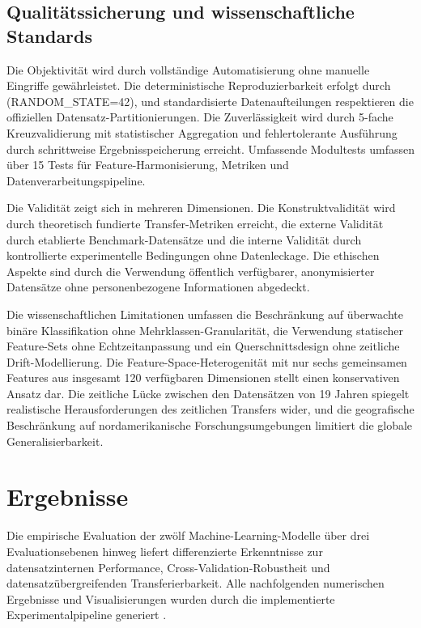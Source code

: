 \documentclass[11pt,a4paper]{article}
\begin{document}
    \subsection{Qualitätssicherung und wissenschaftliche Standards}

    Die Objektivität wird durch vollständige Automatisierung ohne manuelle Eingriffe gewährleistet. Die deterministische Reproduzierbarkeit erfolgt durch (RANDOM\_STATE=42), und standardisierte Datenaufteilungen respektieren die offiziellen Datensatz-Partitionierungen. Die Zuverlässigkeit wird durch 5-fache Kreuzvalidierung mit statistischer Aggregation und fehlertolerante Ausführung durch schrittweise Ergebnisspeicherung erreicht. Umfassende Modultests umfassen über 15 Tests für Feature-Harmonisierung, Metriken und Datenverarbeitungspipeline.

    Die Validität zeigt sich in mehreren Dimensionen. Die Konstruktvalidität wird durch theoretisch fundierte Transfer-Metriken erreicht, die externe Validität durch etablierte Benchmark-Datensätze und die interne Validität durch kontrollierte experimentelle Bedingungen ohne Datenleckage. Die ethischen Aspekte sind durch die Verwendung öffentlich verfügbarer, anonymisierter Datensätze ohne personenbezogene Informationen abgedeckt.

    Die wissenschaftlichen Limitationen umfassen die Beschränkung auf überwachte binäre Klassifikation ohne Mehrklassen-Granularität, die Verwendung statischer Feature-Sets ohne Echtzeitanpassung und ein Querschnittsdesign ohne zeitliche Drift-Modellierung. Die Feature-Space-Heterogenität mit nur sechs gemeinsamen Features aus insgesamt 120 verfügbaren Dimensionen stellt einen konservativen Ansatz dar. Die zeitliche Lücke zwischen den Datensätzen von 19 Jahren spiegelt realistische Herausforderungen des zeitlichen Transfers wider, und die geografische Beschränkung auf nordamerikanische Forschungsumgebungen limitiert die globale Generalisierbarkeit.

    \clearpage

    \section{Ergebnisse}

    Die empirische Evaluation der zwölf Machine-Learning-Modelle über drei Evaluationsebenen hinweg liefert differenzierte Erkenntnisse zur datensatzinternen Performance, Cross-Validation-Robustheit und datensatzübergreifenden Transferierbarkeit. Alle nachfolgenden numerischen Ergebnisse und Visualisierungen wurden durch die implementierte Experimentalpipeline generiert \parencite{Weirauch2025}.
\end{document}
